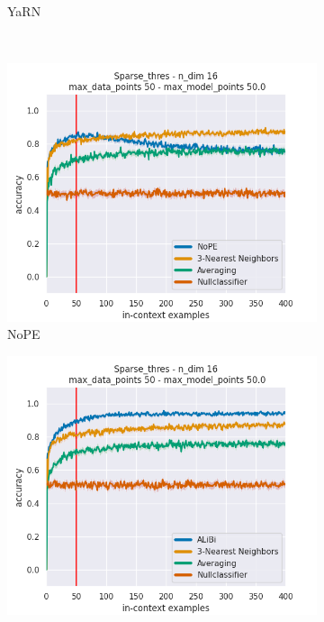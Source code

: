 \documentclass[letterpaper]{article} %
\begin{document}
\begin{figure}[tp]
\begin{subfigure}[t]{0.24\linewidth}
        \caption{YaRN}
    \end{subfigure}
    \\
    \begin{subfigure}[t]{0.24\linewidth}
        \includegraphics[width=\linewidth]{AnonymousSubmission/LaTeX/imgs/experiments/threshold/nope.png}
        \caption{NoPE}
    \end{subfigure}
    \begin{subfigure}[t]{0.24\linewidth}
        \includegraphics[width=\linewidth]{AnonymousSubmission/LaTeX/imgs/experiments/threshold/alibi.png}

\end{subfigure}
\end{figure}
\end{document}
